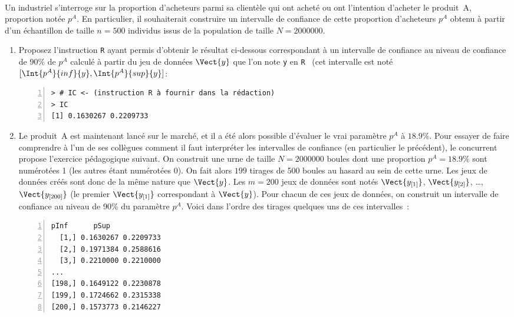 \documentclass[]{article}
\begin{document}
\begin{exercice}~

Un industriel s'interroge sur la proportion d'acheteurs parmi sa clientèle qui ont acheté ou ont l'intention d'acheter le produit~A, proportion notée $p^A$. En particulier, il souhaiterait construire un intervalle de confiance de cette proportion d'acheteurs $p^A$ obtenu à partir d'un échantillon de taille $n=500$ individus issus de la population de taille $N=2000000$. 

\begin{enumerate}



\item  Proposez l'instruction \texttt{R} ayant permis d'obtenir le résultat ci-dessous correspondant à un intervalle de confiance au niveau de confiance de 90\% de $p^A$ calculé à partir du jeu de données $\Vect{y}$ que l'on note \texttt{y} en \texttt{R}~ (cet intervalle est noté $[\Int{p^A}{inf}{y} , \Int{p^A}{sup}{y} ]$:

\IndicR
\begin{Verbatim}[frame=leftline,fontfamily=tt,fontshape=n,numbers=left]
> # IC <- (instruction R à fournir dans la rédaction)
> IC
[1] 0.1630267 0.2209733
\end{Verbatim}




\item Le produit~A est maintenant lancé sur le marché, et il a été alors possible d'évaluer le vrai paramètre $p^A$ à $18.9\%$. Pour essayer de faire comprendre à l'un de ses collègues comment il faut interpréter les intervalles de confiance (en particulier le précédent), le concurrent propose l'exercice pédagogique suivant. On construit une urne de taille $N=2000000$ boules dont une proportion $p^A=18.9\%$ sont numérotées 1 (les autres étant numérotées 0). On fait alors $199$ tirages de 500 boules au hasard au sein de cette urne. Les jeux de données créés sont donc de la même nature que $\Vect{y}$. Les $m=200$ jeux de données sont notés $\Vect{y_{[1]}}$, $\Vect{y_{[2]}}$, \ldots, $\Vect{y_{[200]}}$ (le premier $\Vect{y_{[1]}}$ correspondant à $\Vect{y}$). Pour chacun de ces jeux de données, on construit un intervalle de confiance au niveau de 90\% du paramètre $p^A$. 
Voici dans l'ordre des tirages quelques uns de ces intervalles~:


\begin{Verbatim}[frame=leftline,fontfamily=tt,fontshape=n,numbers=left]
pInf      pSup
  [1,] 0.1630267 0.2209733
  [2,] 0.1971384 0.2588616
  [3,] 0.2210000 0.2210000
...
[198,] 0.1649122 0.2230878
[199,] 0.1724662 0.2315338
[200,] 0.1573773 0.2146227
\end{Verbatim}



\end{enumerate}
\end{exercice}
\end{document}
